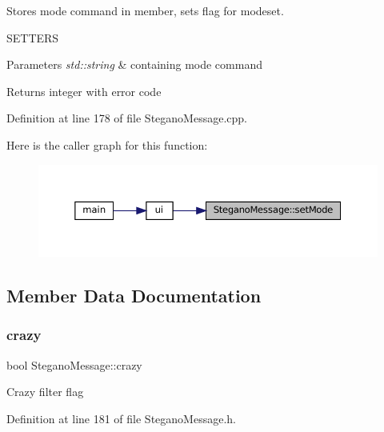 Stores mode command in member, sets flag for modeset. 

S\+E\+T\+T\+E\+RS
\begin{DoxyParams}{Parameters}
{\em std\+::string} & containing mode command \\
\hline
\end{DoxyParams}
\begin{DoxyReturn}{Returns}
integer with error code 
\end{DoxyReturn}


Definition at line 178 of file Stegano\+Message.\+cpp.

Here is the caller graph for this function\+:
\nopagebreak
\begin{figure}[H]
\begin{center}
\leavevmode
\includegraphics[width=350pt]{classSteganoMessage_a3e06a73baa5744b5eb9152f4ae65f458_icgraph}
\end{center}
\end{figure}


\subsection{Member Data Documentation}
\mbox{\label{classSteganoMessage_aa66c9e1d0367981d42ede819e1a51131}} 
\subsubsection{\texorpdfstring{crazy}{crazy}}
{\footnotesize\ttfamily bool Stegano\+Message\+::crazy\hspace{0.3cm}{\ttfamily [private]}}

Crazy filter flag 

Definition at line 181 of file Stegano\+Message.\+h.

\mbox{\label{classSteganoMessage_a26b631e00716be7a89cbcf22cf0b7291}} 
